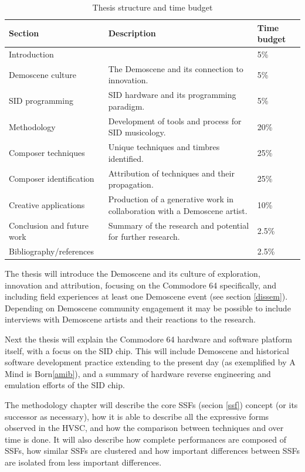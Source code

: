 \documentclass[10pt]{article}
\begin{document}
\begin{multicols*}{2}
\begin{table}[htb]
  \begin{tabular}{|l|l|l|}
        \hline
        Section & Description & Time budget \\
        \hline
        Introduction &  & 5\% \\
        \hline
        Demoscene culture & The Demoscene and its connection to innovation. & 5\% \\
        \hline
        SID programming & SID hardware and its programming paradigm. & 5\% \\
        \hline
        Methodology & Development of tools and process for SID musicology. & 20\% \\
        \hline
        Composer techniques & Unique techniques and timbres identified. & 25\% \\
        \hline
        Composer identification & Attribution of techniques and their propagation. & 25\% \\
        \hline
        Creative applications & Production of a generative work in collaboration with a Demoscene artist.  & 10\% \\
        \hline
        Conclusion and future work & Summary of the research and potential for further research. & 2.5\% \\
        \hline
        Bibliography/references &  & 2.5\% \\
        \hline
  \end{tabular}
  \caption{Thesis structure and time budget}
  \label{table:timebudget}
\end{table}

The thesis will introduce the Demoscene and its culture of exploration, innovation and attribution, focusing on the Commodore 64 specifically, and including field experiences at least one Demoscene event (see section \ref{dissem}). Depending on Demoscene community engagement it may be possible to include interviews with Demoscene artists and their reactions to the research.

Next the thesis will explain the Commodore 64 hardware and software platform itself, with a focus on the SID chip. This will include Demoscene and historical software development practice extending to the present day (as exemplified by A Mind is Born\ref{amib}), and a summary of hardware reverse engineering and emulation efforts of the SID chip.

The methodology chapter will describe the core SSFs (secion \ref{ssf}) concept (or its successor as necessary), how it is able to describe all the expressive forms observed in the HVSC, and how the comparison between techniques and over time is done. It will also describe how complete performances are composed of SSFs, how similar SSFs are clustered and how important differences between SSFs are isolated from less important differences.


\end{multicols*}
\end{document}
